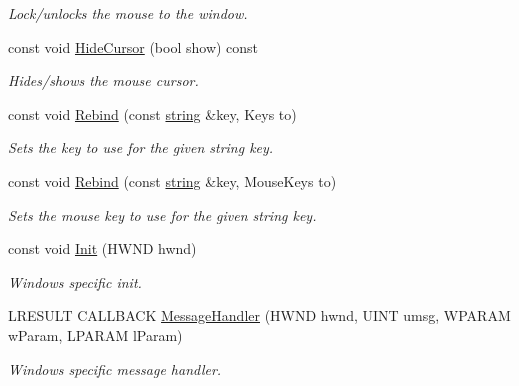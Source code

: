 \begin{DoxyCompactItemize}
\begin{DoxyCompactList}\small\item\em Lock/unlocks the mouse to the window. \end{DoxyCompactList}\item 
const void \hyperlink{class_ensum_1_1_input_1_1_input_a7474a1ff2d8dd75cc7b594514dd762ed}{Hide\+Cursor} (bool show) const \hypertarget{class_ensum_1_1_input_1_1_input_a7474a1ff2d8dd75cc7b594514dd762ed}{}\label{class_ensum_1_1_input_1_1_input_a7474a1ff2d8dd75cc7b594514dd762ed}

\begin{DoxyCompactList}\small\item\em Hides/shows the mouse cursor. \end{DoxyCompactList}\item 
const void \hyperlink{class_ensum_1_1_input_1_1_input_adead3d550bc0cad6e65e1fffc2b14a4b}{Rebind} (const \hyperlink{class_ensum_1_1string}{string} \&key, Keys to)\hypertarget{class_ensum_1_1_input_1_1_input_adead3d550bc0cad6e65e1fffc2b14a4b}{}\label{class_ensum_1_1_input_1_1_input_adead3d550bc0cad6e65e1fffc2b14a4b}

\begin{DoxyCompactList}\small\item\em Sets the key to use for the given string key. \end{DoxyCompactList}\item 
const void \hyperlink{class_ensum_1_1_input_1_1_input_a4117e154d7ca22eb0d32a5f4b899672c}{Rebind} (const \hyperlink{class_ensum_1_1string}{string} \&key, Mouse\+Keys to)\hypertarget{class_ensum_1_1_input_1_1_input_a4117e154d7ca22eb0d32a5f4b899672c}{}\label{class_ensum_1_1_input_1_1_input_a4117e154d7ca22eb0d32a5f4b899672c}

\begin{DoxyCompactList}\small\item\em Sets the mouse key to use for the given string key. \end{DoxyCompactList}\item 
const void \hyperlink{class_ensum_1_1_input_1_1_input_a4bb72a770bc738add5e108851e6f5467}{Init} (H\+W\+ND hwnd)\hypertarget{class_ensum_1_1_input_1_1_input_a4bb72a770bc738add5e108851e6f5467}{}\label{class_ensum_1_1_input_1_1_input_a4bb72a770bc738add5e108851e6f5467}

\begin{DoxyCompactList}\small\item\em Windows specific init. \end{DoxyCompactList}\item 
L\+R\+E\+S\+U\+LT C\+A\+L\+L\+B\+A\+CK \hyperlink{class_ensum_1_1_input_1_1_input_aae4be7b638bbfbb75afd3bb8d782cbae}{Message\+Handler} (H\+W\+ND hwnd, U\+I\+NT umsg, W\+P\+A\+R\+AM w\+Param, L\+P\+A\+R\+AM l\+Param)\hypertarget{class_ensum_1_1_input_1_1_input_aae4be7b638bbfbb75afd3bb8d782cbae}{}\label{class_ensum_1_1_input_1_1_input_aae4be7b638bbfbb75afd3bb8d782cbae}

\begin{DoxyCompactList}\small\item\em Windows specific message handler. \end{DoxyCompactList}\end{DoxyCompactItemize}
